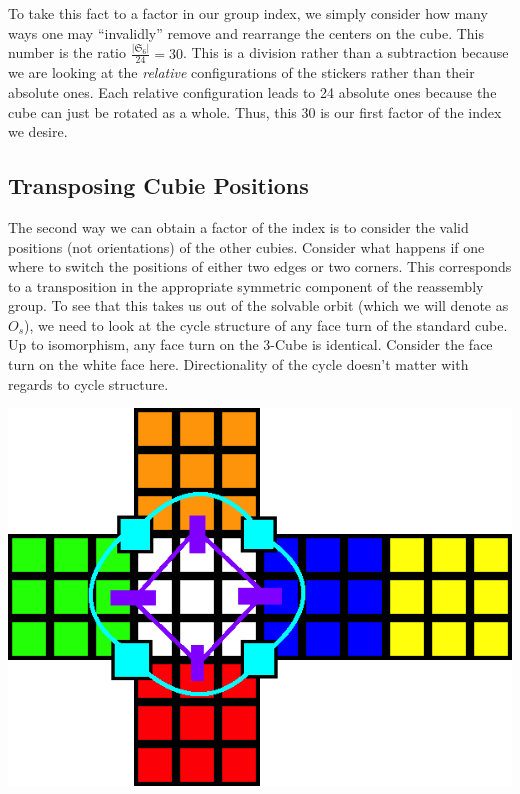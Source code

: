 \documentclass[10pt,letterpaper]{report}
\begin{document}
To take this fact to a factor in our group index, we simply consider how many ways one may ``invalidly'' remove and rearrange the centers on the cube.  This number is the ratio $\frac{|\mathfrak{S}_6|}{24} = 30$.  This is a division rather than a subtraction because we are looking at the \textit{relative} configurations of the stickers rather than their absolute ones.  Each relative configuration leads to 24 absolute ones because the cube can just be rotated as a whole.  Thus, this 30 is our first factor of the index we desire.

\subsection{Transposing Cubie Positions}

The second way we can obtain a factor of the index is to consider the valid positions (not orientations) of the other cubies.  Consider what happens if one where to switch the positions of either two edges or two corners.  This corresponds to a transposition in the appropriate symmetric component of the reassembly group.  To see that this takes us out of the solvable orbit (which we will denote as $O_s$), we need to look at the cycle structure of any face turn of the standard cube. \\

Up to isomorphism, any face turn on the 3-Cube is identical.  Consider the face turn on the white face here.  Directionality of the cycle doesn't matter with regards to cycle structure.

\begin{center}
\includegraphics[scale=.5]{images/faceCubieCycle.png} 
\end{center}
\end{document}
